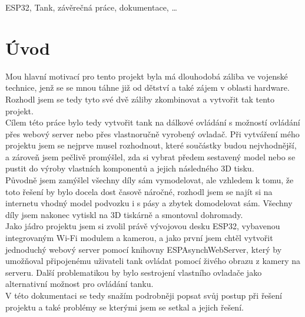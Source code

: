 \documentclass[12pt, a4paper,
oneside
openany
]{report}
\renewcommand{\headrulewidth}{0.025pt}
\begin{document}
	\vspace{18pt}
	
	
	\noindent ESP32, Tank, závěrečná práce, dokumentace, \dots 
	
	
	\clearpage %



\fancypagestyle{originalplain}{
  \fancyhf{}
  \fancyfoot[C]{\thepage} 
  \renewcommand{\headrulewidth}{0pt}
  \renewcommand{\footrulewidth}{0pt}
}


\fancypagestyle{plain}{
  \fancyhf{} 
  \renewcommand{\headrulewidth}{0pt}
  \renewcommand{\footrulewidth}{0pt}
}

\pagestyle{empty} 
	\tableofcontents 
 
	\chapter*{Úvod}
 \fancypagestyle{plain}{%

  \fancyhf{}
  \fancyfoot[C]{\thepage} 
  \renewcommand{\headrulewidth}{0pt}
  \renewcommand{\footrulewidth}{0pt}
}
    \pagestyle{plain}
 
\noindent Mou hlavní motivací pro tento projekt byla má dlouhodobá záliba ve vojenské technice, jenž se se mnou táhne již od dětství a také zájem v oblasti hardware. Rozhodl jsem se tedy tyto své dvě záliby zkombinovat a vytvořit tak tento projekt. \\
Cílem této práce bylo tedy vytvořit tank na dálkové ovládání s možností ovládání přes webový server nebo přes vlastnoručně vyrobený ovladač.
Při vytváření mého projektu jsem se nejprve musel rozhodnout, které součástky budou nejvhodnější, a zároveň jsem pečlivě promýšlel, zda si vybrat předem sestavený model nebo se pustit do výroby vlastních komponentů a jejich následného 3D tisku.\\
Původně jsem zamýšlel všechny díly sám vymodelovat, ale vzhledem k tomu, že toto řešení by bylo docela dost časově náročné, rozhodl jsem se najít si na internetu vhodný model podvozku i s pásy a zbytek domodelovat sám. Všechny díly jsem nakonec vytiskl na 3D tiskárně a smontoval dohromady.\\
Jako jádro projektu jsem si zvolil právě vývojovou desku ESP32, vybavenou integrovaným Wi-Fi modulem a kamerou, a jako první jsem chtěl vytvořit jednoduchý webový server pomocí knihovny ESPAsynchWebServer, který by umožňoval připojenému uživateli tank ovládat pomocí živého obrazu z kamery na serveru. Další problematikou by bylo sestrojení vlastního ovladače jako alternativní možnost pro ovládání tanku.\\
V této dokumentaci se tedy snažím podrobněji popsat svůj postup při řešení projektu a také problémy se kterými jsem se setkal a jejich řešení. 
\end{document}
